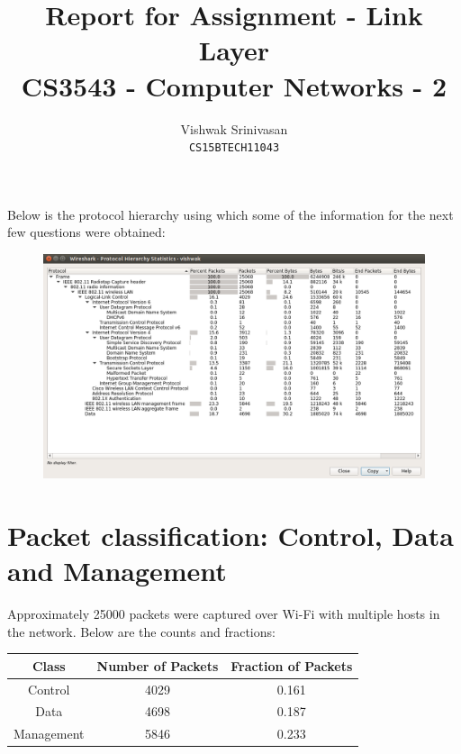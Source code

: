 \documentclass{article}
\title{Report for Assignment - Link Layer\\
CS3543 - Computer Networks - 2}
\author{Vishwak Srinivasan\\
\texttt{CS15BTECH11043}}
\date{}
\begin{document}
\maketitle 

\begin{flushleft}
Below is the protocol hierarchy using which some of the information for the next few questions were obtained:
\begin{figure}[H]
\centering
\includegraphics[width=0.7\linewidth]{protocol-hierarchy.png}
\end{figure}
\end{flushleft}

\section{Packet classification: Control, Data and Management}
\begin{flushleft}
Approximately 25000 packets were captured over Wi-Fi with multiple hosts in the network. Below are the counts and fractions:
\begin{center}
\begin{tabular}{|c|c|c|}
\hline
Class & Number of Packets & Fraction of Packets \\
\hline
\hline
Control & 4029 & 0.161 \\
\hline
Data & 4698 & 0.187 \\
\hline
Management & 5846 & 0.233 \\
\hline
\end{tabular}
\end{center}
\end{flushleft}
\end{document}
